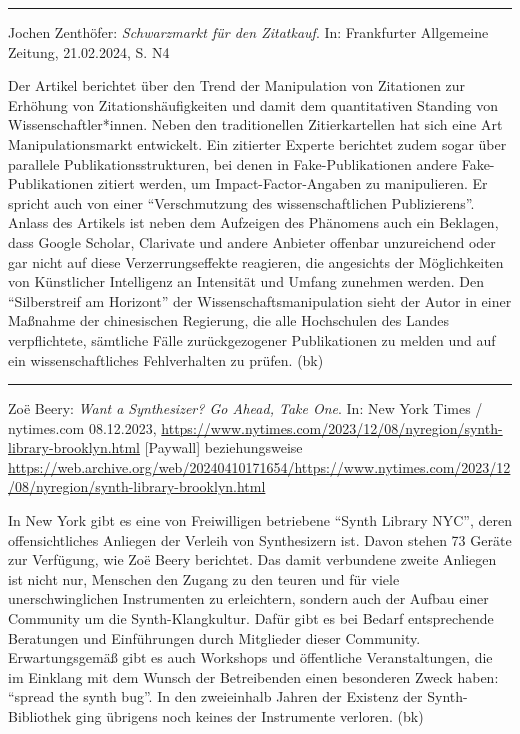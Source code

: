 \documentclass[a4paper,
fontsize=11pt,
oneside,
numbers=noperiodatend,
parskip=half-,
bibliography=totoc,
final
]{scrartcl}
\begin{document}
\begin{center}\rule{0.5\linewidth}{0.5pt}\end{center}

Jochen Zenthöfer: \emph{Schwarzmarkt für den Zitatkauf}. In: Frankfurter
Allgemeine Zeitung, 21.02.2024, S. N4

Der Artikel berichtet über den Trend der Manipulation von Zitationen zur
Erhöhung von Zitationshäufigkeiten und damit dem quantitativen Standing
von Wissenschaftler*innen. Neben den traditionellen Zitierkartellen hat
sich eine Art Manipulationsmarkt entwickelt. Ein zitierter Experte
berichtet zudem sogar über parallele Publikationsstrukturen, bei denen
in Fake-Publikationen andere Fake-Publikationen zitiert werden, um
Impact-Factor-Angaben zu manipulieren. Er spricht auch von einer
\enquote{Verschmutzung des wissenschaftlichen Publizierens}. Anlass des
Artikels ist neben dem Aufzeigen des Phänomens auch ein Beklagen, dass
Google Scholar, Clarivate und andere Anbieter offenbar unzureichend oder
gar nicht auf diese Verzerrungseffekte reagieren, die angesichts der
Möglichkeiten von Künstlicher Intelligenz an Intensität und Umfang
zunehmen werden. Den \enquote{Silberstreif am Horizont} der
Wissenschaftsmanipulation sieht der Autor in einer Maßnahme der
chinesischen Regierung, die alle Hochschulen des Landes verpflichtete,
sämtliche Fälle zurückgezogener Publikationen zu melden und auf ein
wissenschaftliches Fehlverhalten zu prüfen. (bk)

\begin{center}\rule{0.5\linewidth}{0.5pt}\end{center}

Zoë Beery: \emph{Want a Synthesizer? Go Ahead, Take One}. In: New York
Times / nytimes.com 08.12.2023,
\url{https://www.nytimes.com/2023/12/08/nyregion/synth-library-brooklyn.html}
{[}Paywall{]} beziehungsweise
\url{https://web.archive.org/web/20240410171654/https://www.nytimes.com/2023/12/08/nyregion/synth-library-brooklyn.html}

In New York gibt es eine von Freiwilligen betriebene \enquote{Synth
Library NYC}, deren offensichtliches Anliegen der Verleih von
Synthesizern ist. Davon stehen 73 Geräte zur Verfügung, wie Zoë Beery
berichtet. Das damit verbundene zweite Anliegen ist nicht nur, Menschen
den Zugang zu den teuren und für viele unerschwinglichen Instrumenten zu
erleichtern, sondern auch der Aufbau einer Community um die
Synth-Klangkultur. Dafür gibt es bei Bedarf entsprechende Beratungen und
Einführungen durch Mitglieder dieser Community. Erwartungsgemäß gibt es
auch Workshops und öffentliche Veranstaltungen, die im Einklang mit dem
Wunsch der Betreibenden einen besonderen Zweck haben: \enquote{spread
the synth bug}. In den zweieinhalb Jahren der Existenz der
Synth-Bibliothek ging übrigens noch keines der Instrumente verloren.
(bk)
\end{document}
